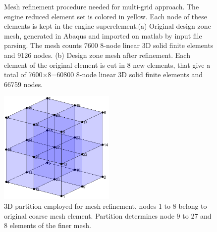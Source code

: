   \begin{figure}[hbt!]
  \centering
       \caption{Mesh refinement procedure needed for multi-grid approach. The engine reduced element set is colored in yellow. Each node of these elements is kept in the engine superelement.(a) Original design zone mesh, generated in Abaqus and imported on matlab by input file parsing. The mesh counts 7600 8-node linear 3D solid finite elements and 9126 nodes. (b) Design zone mesh after refinement. Each element of the original element is cut in 8 new elements, that give a total of 7600$\times$8=60800 8-node linear 3D solid finite elements and  66759 nodes. }
       \label{f7}
     \end{figure} 
    \begin{figure}[hbt!]
        \centering
\includegraphics[width=0.5\textwidth]{images/Ch1/partition_3D.eps}
  \caption{3D partition employed for mesh refinement, nodes 1 to 8 belong to original coarse mesh element. Partition determines node 9 to 27 and 8 elements of the finer mesh.  }
       \label{f8}
     \end{figure}
